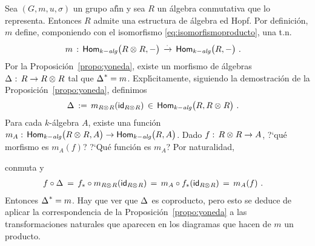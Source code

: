 \begin{obsRepresentabilidad}\label{obs:representabilidad}
	Sea $(G,m,u,\sigma)$ un grupo af\'{\i}n y sea $R$ un \'{a}lgebra
	conmutativa que lo representa. Entonces $R$ admite una estructura de
	\'{a}lgebra ed Hopf. Por definici\'{o}n, $m$ define, componiendo con el
	isomorfismo \eqref{eq:isomorfismoproducto}, una t.n.
	\begin{align*}
		m & \,:\,\Homalg\big(R\tensor R,-\big) \,\xrightarrow\cdot\,
			\Homalg\big(R,-\big)
		\text{ .}
	\end{align*}
	Por la Proposici\'{o}n~\ref{propo:yoneda}, existe un morfismo de
	\'{a}lgebras $\coproducto:\,R\rightarrow R\tensor R$ tal que
	$\pull\coproducto=m$. Expl\'{\i}citamente, siguiendo la
	demostraci\'{o}n de la Proposici\'{o}n~\ref{propo:yoneda}, definimos
	\begin{align*}
		\coproducto & \,:=\, m_{R\tensor R}(\id[R\tensor R])\,\in\,
			\Homalg\big(R,R\tensor R\big)
		\text{ .}
	\end{align*}
	Para cada $k$-\'{a}lgebra $A$, existe una funci\'{o}n
	$m_A:\,\Homalg\big(R\tensor R,A\big)\rightarrow\Homalg\big(R,A\big)$.
	Dado $f:\,R\tensor R\rightarrow A$, ?`qu\'{e} morfismo es $m_A(f)$?
	?`Qu\'{e} funci\'{o}n es $m_A$? Por naturalidad,
	\begin{center}
	\end{center}
	conmuta y
	\begin{align*}
		f\circ\coproducto & \,=\,
			\push f\circ m_{R\tensor R}(\id[R\tensor R])
			\,=\,m_A\circ\push f(\id[R\tensor R])
			\,=\,m_A(f)
		\text{ .}
	\end{align*}
	Entonces $\pull\coproducto=m$. Hay que ver que $\coproducto$ es
	coproducto, pero esto se deduce de aplicar la correspondencia de la
	Proposici\'{o}n~\ref{propo:yoneda} a las transformaciones naturales que
	aparecen en los diagramas que hacen de $m$ un producto.
\end{obsRepresentabilidad}
